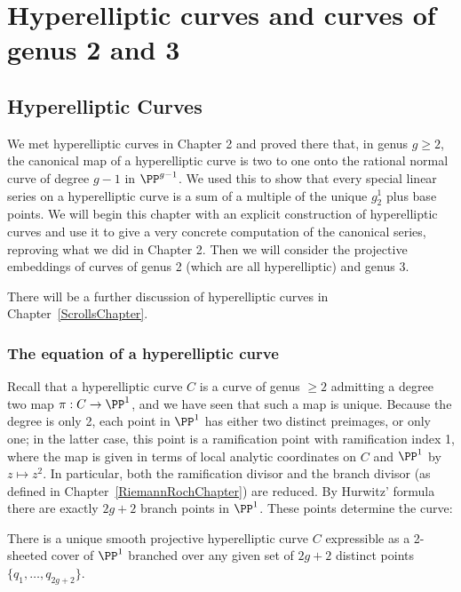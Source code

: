 

\chapter{Hyperelliptic curves and curves of genus 2 and 3}\label{genus 2 and 3 chapter}

\section{Hyperelliptic Curves}\label{hyperelliptic}
 
We met hyperelliptic curves in Chapter 2 and proved there that, in genus $g \geq 2$, the canonical
map of a hyperelliptic curve is two to one onto the rational normal curve of degree $g-1$ in $\PP^{g-1}$. We used this to show that every special linear series on a hyperelliptic curve is a sum of a multiple of  the 
unique $g^1_2$ plus base points. We will begin this chapter with an explicit construction of hyperelliptic curves and use it to give a very concrete computation of the canonical series, reproving what we did in Chapter 2. Then we will consider the projective embeddings of curves of genus 2 (which are all hyperelliptic) and genus 3.
 
There will be a further discussion of hyperelliptic curves in Chapter~\ref{ScrollsChapter}.
  
 \subsection{The equation of a hyperelliptic curve}
 
Recall that a hyperelliptic curve $C$ is a curve of genus $\geq 2$ admitting a degree two map $\pi : C \to \PP^1$, and we have seen that such a map is unique. Because the degree is only 2, each point in $\PP^1$ has either two distinct preimages, or only one; in the latter case, this point is a ramification point with ramification index 1, where the map is given in terms of local analytic coordinates on $C$ and $\PP^1$ by $z \mapsto z^2$. In particular, both the ramification divisor and the branch divisor (as defined in Chapter~\ref{RiemannRochChapter}) are reduced. By  Hurwitz' formula there are exactly $2g+2$ branch points in $\PP^1$. These points determine the curve:
 
\begin{theorem}\label{hyperelliptic existence}
There is a unique smooth projective hyperelliptic curve $C$ expressible as a 2-sheeted cover of $\PP^1$ branched over any given set of $2g+2$ distinct points $\{q_{1}, \dots, q_{2g+2}\}$.
\end{theorem}

